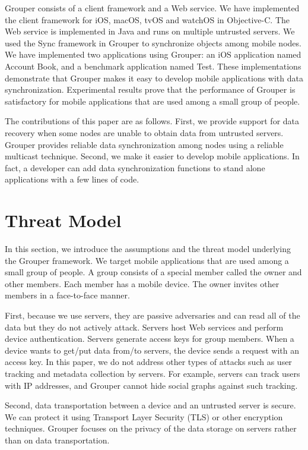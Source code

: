\documentclass[sigconf]{acmart}
\begin{document}
Grouper consists of a client framework and a Web service.
We have implemented the client framework for iOS, macOS, tvOS and watchOS in Objective-C.
The Web service is implemented in Java and runs on multiple untrusted servers.
We used the Sync\cite{sync} framework in Grouper to synchronize objects among mobile nodes.
We have implemented two applications using Grouper: an iOS application named Account Book, and a benchmark application named Test.
These implementations demonstrate that Grouper makes it easy to develop mobile applications with data synchronization.
Experimental results prove that the performance of Grouper is satisfactory for mobile applications that are used among a small group of people.

The contributions of this paper are as follows.
First, we provide support for data recovery when some nodes are unable to obtain data from untrusted servers.
Grouper provides reliable data synchronization among nodes using a reliable multicast technique.
Second, we make it easier to develop mobile applications.
In fact, a developer can add data synchronization functions to stand alone applications with a few lines of code.

\section{Threat Model}

In this section, we introduce the assumptions and the threat model underlying the Grouper framework.
We target mobile applications that are used among a small group of people.
A group consists of a special member called the owner and other members.
Each member has a mobile device.
The owner invites other members in a face-to-face manner.

First, because we use servers, they are passive adversaries and can read all of the data but they do not actively attack.
Servers host Web services and perform device authentication.
Servers generate access keys for group members. 
When a device wants to get/put data from/to servers, the device sends a request with an access key.
In this paper, we do not address other types of attacks such as user tracking and metadata collection by servers. 
For example, servers can track users with IP addresses, and Grouper cannot hide social graphs against such tracking.

Second, data transportation between a device and an untrusted server is secure.
We can protect it using Transport Layer Security (TLS) or other encryption techniques.
Grouper focuses on the privacy of the data storage on servers rather than on data transportation.
\end{document}
